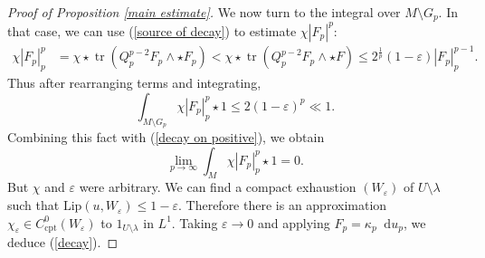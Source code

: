 \documentclass[reqno,11pt]{amsart}
\newcommand*\dif{\mathop{}\!\mathrm{d}}
\DeclareMathOperator{\tr}{tr}
\newcommand{\Lip}{\mathrm{Lip}}
\newcommand{\cpt}{\mathrm{cpt}}
\theoremstyle{definition}
\numberwithin{equation}{section}
\begin{document}
\begin{proof}[Proof of Proposition \ref{main estimate}]
We now turn to the integral over $M \setminus G_p$.
In that case, we can use (\ref{source of decay}) to estimate $\chi |F_p|^p$:
\begin{align*}
\chi |F_p|_p^p &= \chi \star \tr(Q_p^{p - 2} F_p \wedge \star F_p) < \chi \star \tr(Q_p^{p - 2} F_p \wedge \star F) \leq 2^{\frac{1}{p}} (1 - \varepsilon) |F_p|_p^{p - 1}.
\end{align*}
Thus after rearranging terms and integrating,
$$\int_{M \setminus G_p} \chi |F_p|_p^p \star 1 \leq 2(1 - \varepsilon)^p \ll 1.$$
Combining this fact with (\ref{decay on positive}), we obtain 
$$\lim_{p \to \infty} \int_M \chi |F_p|_p^p \star 1 = 0.$$
But $\chi$ and $\varepsilon$ were arbitrary.
We can find a compact exhaustion $(W_\varepsilon)$ of $U \setminus \lambda$ such that $\Lip(u, W_\varepsilon) \leq 1 - \varepsilon$.
Therefore there is an approximation $\chi_\varepsilon \in C^0_\cpt(W_\varepsilon)$ to $1_{U \setminus \lambda}$ in $L^1$.
Taking $\varepsilon \to 0$ and applying $F_p = \kappa_p \dif u_p$, we deduce (\ref{decay}).
\end{proof}

\end{document}
